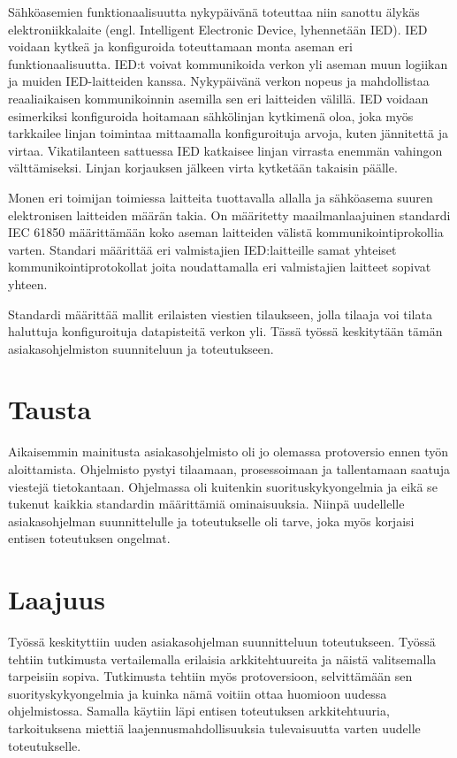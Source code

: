 Sähköasemien funktionaalisuutta nykypäivänä toteuttaa niin sanottu älykäs elektroniikkalaite (engl. Intelligent Electronic Device, lyhennetään IED). IED voidaan kytkeä ja konfiguroida toteuttamaan monta aseman eri funktionaalisuutta. IED:t voivat kommunikoida verkon yli aseman muun logiikan ja muiden IED-laitteiden kanssa. Nykypäivänä verkon nopeus ja mahdollistaa reaaliaikaisen kommunikoinnin asemilla sen eri laitteiden välillä. IED voidaan esimerkiksi konfiguroida hoitamaan sähkölinjan kytkimenä oloa, joka myös tarkkailee linjan toimintaa mittaamalla konfiguroituja arvoja, kuten jännitettä ja virtaa. Vikatilanteen sattuessa IED katkaisee linjan virrasta enemmän vahingon välttämiseksi. Linjan korjauksen jälkeen virta kytketään takaisin päälle.

Monen eri toimijan toimiessa laitteita tuottavalla allalla ja sähköasema suuren elektronisen laitteiden määrän takia. On määritetty maailmanlaajuinen standardi IEC 61850 määrittämään koko aseman laitteiden välistä kommunikointiprokollia varten. Standari määrittää eri valmistajien IED:laitteille samat yhteiset kommunikointiprotokollat joita noudattamalla eri valmistajien laitteet sopivat yhteen.

Standardi määrittää mallit erilaisten viestien tilaukseen, jolla tilaaja voi tilata haluttuja konfiguroituja datapisteitä verkon yli. Tässä työssä keskitytään tämän asiakasohjelmiston suunniteluun ja toteutukseen.

\section{Tausta}

Aikaisemmin mainitusta asiakasohjelmisto oli jo olemassa protoversio ennen työn aloittamista. Ohjelmisto pystyi tilaamaan, prosessoimaan ja tallentamaan saatuja viestejä tietokantaan. Ohjelmassa oli kuitenkin suorituskykyongelmia ja eikä se tukenut kaikkia standardin määrittämiä ominaisuuksia. Niinpä uudellelle asiakasohjelman suunnittelulle ja toteutukselle oli tarve, joka myös korjaisi entisen toteutuksen ongelmat.

\section{Laajuus}

Työssä keskityttiin uuden asiakasohjelman suunnitteluun toteutukseen. Työssä tehtiin tutkimusta vertailemalla erilaisia arkkitehtuureita ja näistä valitsemalla tarpeisiin sopiva. Tutkimusta tehtiin myös protoversioon, selvittämään sen suorityskykyongelmia ja kuinka nämä voitiin ottaa huomioon uudessa ohjelmistossa. Samalla käytiin läpi entisen toteutuksen arkkitehtuuria, tarkoituksena miettiä laajennusmahdollisuuksia tulevaisuutta varten uudelle toteutukselle.

